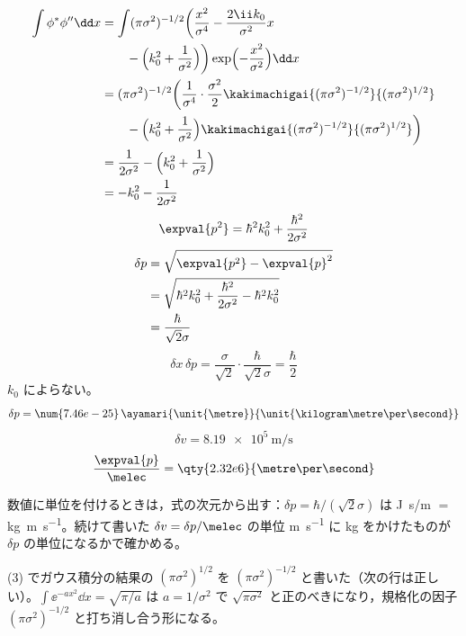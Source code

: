 \begin{align*}
\int\phi^{*}\phi''\dd x&=\int(\pi\sigma^{2})^{-1/2}\biggl(\frac{x^{2}}{\sigma^{4}}-\frac{2\ii k_{0}}{\sigma^{2}}x\\
&\qquad-\Bigl(k_{0}^{2}+\frac{1}{\sigma^{2}}\Bigr)\biggr)\exp\Bigl(-\frac{x^{2}}{\sigma^{2}}\Bigr)\dd x\\
&=(\pi\sigma^{2})^{-1/2}\biggl(\frac{1}{\sigma^{4}}\cdot\frac{\sigma^{2}}{2}\kakimachigai{(\pi\sigma^{2})^{-1/2}}{(\pi\sigma^{2})^{1/2}}\\
&\qquad-\Bigl(k_{0}^{2}+\frac{1}{\sigma^{2}}\Bigr)\kakimachigai{(\pi\sigma^{2})^{-1/2}}{(\pi\sigma^{2})^{1/2}}\biggr)\\
&=\frac{1}{2\sigma^{2}}-\Bigl(k_{0}^{2}+\frac{1}{\sigma^{2}}\Bigr)\\
&=-k_{0}^{2}-\frac{1}{2\sigma^{2}}
\end{align*}
\[ \expval{p^{2}}=\hbar^{2}k_{0}^{2}+\frac{\hbar^{2}}{2\sigma^{2}} \]
\begin{align*}
\delta p&=\sqrt{\expval{p^{2}}-\expval{p}^{2}}\\
&=\sqrt{\hbar^{2}k_{0}^{2}+\frac{\hbar^{2}}{2\sigma^{2}}-\hbar^{2}k_{0}^{2}}\\
&=\frac{\hbar}{\sqrt{2}\sigma}
\end{align*}
\[ \delta x\,\delta p=\frac{\sigma}{\sqrt{2}}\cdot\frac{\hbar}{\sqrt{2}\sigma}=\frac{\hbar}{2} \]
$k_{0}$ によらない。
\[ \delta p=\num{7.46e-25}\,\ayamari{\unit{\metre}}{\unit{\kilogram\metre\per\second}} \]
\[ \delta v=\qty{8.19e5}{\metre\per\second} \]
\[ \frac{\expval{p}}{\melec}=\qty{2.32e6}{\metre\per\second} \]
\item 数値に単位を付けるときは，式の次元から出す：$\delta p=\hbar/(\sqrt{2}\sigma)$ は \unit{\joule\second}/\unit{\metre} $=$ \unit{\kilogram\metre\per\second}。続けて書いた $\delta v=\delta p/\melec$ の単位 \unit{\metre\per\second} に \unit{\kilogram} をかけたものが $\delta p$ の単位になるかで確かめる。
\item (3) でガウス積分の結果の $(\pi\sigma^{2})^{1/2}$ を $(\pi\sigma^{2})^{-1/2}$ と書いた（次の行は正しい）。$\int\ee^{-ax^{2}}\dd x=\sqrt{\pi/a}$ は $a=1/\sigma^{2}$ で $\sqrt{\pi\sigma^{2}}$ と正のべきになり，規格化の因子 $(\pi\sigma^{2})^{-1/2}$ と打ち消し合う形になる。
